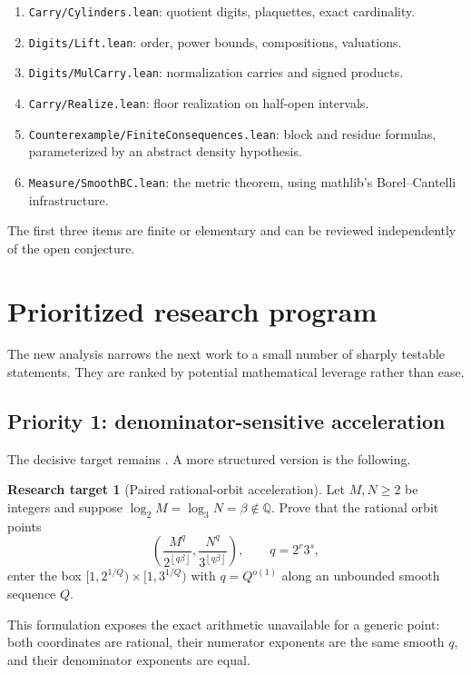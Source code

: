 \documentclass[11pt]{article}
\theoremstyle{definition}
\newtheorem{problem}[theorem]{Research target}
\theoremstyle{remark}
\newcommand{\Q}{\mathbb Q}
\newcommand{\floor}[1]{\left\lfloor#1\right\rfloor}
\begin{document}
\begin{enumerate}
\item \texttt{Carry/Cylinders.lean}: quotient digits, plaquettes, exact cardinality.
\item \texttt{Digits/Lift.lean}: order, power bounds, compositions, valuations.
\item \texttt{Digits/MulCarry.lean}: normalization carries and signed products.
\item \texttt{Carry/Realize.lean}: floor realization on half-open intervals.
\item \texttt{Counterexample/FiniteConsequences.lean}: block and residue formulas,
parameterized by an abstract density hypothesis.
\item \texttt{Measure/SmoothBC.lean}: the metric theorem, using mathlib's
Borel--Cantelli infrastructure.
\end{enumerate}
The first three items are finite or elementary and can be reviewed independently of
the open conjecture.

\section{Prioritized research program}
\label{sec:research-program}

The new analysis narrows the next work to a small number of sharply testable
statements.  They are ranked by potential mathematical leverage rather than ease.

\subsection{Priority 1: denominator-sensitive acceleration}

The decisive target remains .  A more structured
version is the following.

\begin{problem}[Paired rational-orbit acceleration]
Let $M,N\ge2$ be integers and suppose
$\log_2 M=\log_3 N=\beta\notin\Q$.  Prove that the rational orbit points
\[
 \left(\frac{M^q}{2^{\floor{q\beta}}},
       \frac{N^q}{3^{\floor{q\beta}}}\right),
 \qquad q=2^r3^s,
\]
enter the box
$[1,2^{1/Q})\times[1,3^{1/Q})$ with $q=Q^{o(1)}$ along an unbounded smooth sequence
$Q$.
\end{problem}

This formulation exposes the exact arithmetic unavailable for a generic point: both
coordinates are rational, their numerator exponents are the same smooth $q$, and
their denominator exponents are equal.
\end{document}
